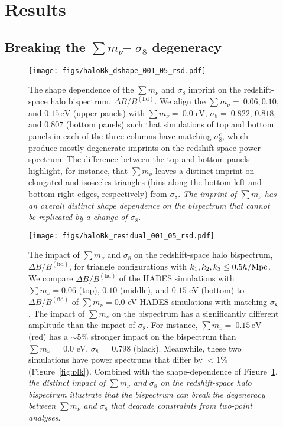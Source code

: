 \documentclass[12pt, letterpaper, preprint]{aastex62}
\newcommand{\smnu}{\sum m_\nu}
\newcommand{\sig}{\sigma_8}
\begin{document}
\section{Results} \label{sec:results} 
\subsection{Breaking the $\smnu$-- $\sig$ degeneracy} \label{sec:mnusig}

\begin{figure}
\begin{center}
\texttt{[image: figs/haloBk\_dshape\_001\_05\_rsd.pdf]} 
    \caption{The shape dependence of the $\smnu$ and $\sig$ imprint on 
    the redshift-space halo bispectrum, $\Delta B/B^\mathrm{(fid)}$. 
    We align the $\smnu{=}~0.06, 0.10$, and $0.15\,\mathrm{eV}$ (upper panels) 
    with $\smnu{=}~0.0$ eV, $\sig{=}~0.822$, $0.818$, and $0.807$ (bottom panels) 
    such that simulations of top and bottom panels in each of the three columns 
    have matching $\sig^{c}$, which produce mostly degenerate imprints on 
    the redshift-space power spectrum. The difference between the top and 
    bottom panels highlight, for instance, that $\smnu$ leaves a distinct
    imprint on elongated and isosceles triangles (bins along the bottom left
    and bottom right edges, respectively) from $\sig$. {\em The imprint of 
    $\smnu$ has an overall distinct shape dependence on the bispectrum that 
    cannot be replicated by a change of $\sig$}. 
    }
\label{fig:dbk_shape}
\end{center}
\end{figure}

\begin{figure}
\begin{center}
\texttt{[image: figs/haloBk\_residual\_001\_05\_rsd.pdf]}
    \caption{The impact of $\smnu$ and $\sig$ on the redshift-space 
    halo bispectrum, $\Delta B/B^\mathrm{(fid)}$, for triangle configurations with 
    $k_1, k_2, k_3 \leq 0.5 h/{\rm Mpc}$. We compare $\Delta B/B^\mathrm{(fid)}$ 
    of the HADES simulations with $\smnu = 0.06$ (top), $0.10$ (middle), and 
    $0.15$ eV (bottom) to $\Delta B/B^\mathrm{(fid)}$ of $\smnu=0.0$ eV HADES 
    simulations with matching $\sig$. The impact of $\smnu$ on the bispectrum
    has a significantly different amplitude than the impact of $\sig$. For 
    instance, $\smnu{=}~0.15\,\mathrm{eV}$ (red) has a $\sim 5\%$ stronger impact 
    on the bispectrum than $\smnu{=}~0.0$ eV, $\sig{=}~0.798$ (black). Meanwhile, 
    these two simulations have power spectrums that differ by $< 1\%$ (Figure~\ref{fig:plk}). 
    Combined with the shape-dependence of Figure~\ref{fig:dbk_shape}, {\em the 
    distinct impact of $\smnu$ and $\sig$ on the redshift-space halo bispectrum 
    illustrate that the bispectrum can break the degeneracy between $\smnu$
    and $\sig$ that degrade constraints from two-point analyses}. 
    }
\label{fig:dbk_amp}
\end{center}
\end{figure}
\end{document}
